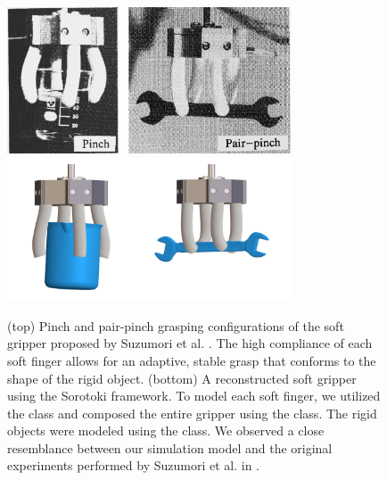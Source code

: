 \begin{figure}[!t]
    \centering
    \includegraphics*[width=0.75\textwidth]{./pdf/thesis-figure-6-26-1.pdf}
    \includegraphics*[width=0.75\textwidth]{./pdf/thesis-figure-6-26-2.pdf}
    \caption{(top) Pinch and pair-pinch grasping configurations of the soft gripper proposed by Suzumori et al. \cite{Suzumori1992, Suzumori1991}. The high compliance of each soft finger allows for an adaptive, stable grasp that conforms to the shape of the rigid object. (bottom) A reconstructed soft gripper using the Sorotoki framework. To model each soft finger, we utilized the  class and composed the entire gripper using the  class. The rigid objects were modeled using the  class. We observed a close resemblance between our simulation model and the original experiments performed by Suzumori et al. in \cite{Suzumori1991, Suzumori1992}.}
    \label{fig:C5:suzumori_gripper_grasp}
    \vspace{-3mm}
\end{figure}


